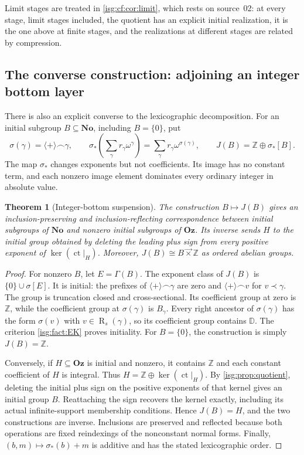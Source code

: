 \documentclass[11pt]{article}
\newtheorem{theorem}{Theorem}[section]
\theoremstyle{definition}
\theoremstyle{remark}
\newcommand{\No}{\ensuremath{\mathbf{No}}}
\newcommand{\Oz}{\ensuremath{\mathbf{Oz}}}
\newcommand{\Z}{\mathbb{Z}}
\newcommand{\D}{\mathbb{D}}
\newcommand{\Rs}{\operatorname{R}_{s}}
\newcommand{\cat}{\mathbin{\frown}}
\newcommand{\plus}{\langle+\rangle}
\newcommand{\pr}{\mathrel{\prec}}
\newcommand{\ct}{\operatorname{ct}}
\newcommand{\lex}{\mathbin{\overrightarrow{\times}}}
\begin{document}
Limit stages are treated in \cref{isg:cf:cor:limit}, which rests on
source~02: at every stage, limit stages included, the quotient has an
explicit initial realization, it is the one above at finite stages, and
the realizations at different stages are related by compression.

\subsection{The converse construction: adjoining an integer bottom layer}
There is also an explicit converse to the lexicographic decomposition.
For an initial subgroup $B\subseteq\No$, including $B=\{0\}$, put
\[
 \sigma(\gamma)=\plus\cat\gamma,
 \qquad
 \sigma_*\left(\sum_\gamma r_\gamma\omega^\gamma\right)
      =\sum_\gamma r_\gamma\omega^{\sigma(\gamma)},
 \qquad J(B)=\Z\oplus\sigma_*[B].
\]
The map $\sigma_*$ changes exponents but not coefficients. Its image has
no constant term, and each nonzero image element dominates every ordinary
integer in absolute value.

\begin{theorem}[Integer-bottom suspension]\label{isg:thm:suspension}
The construction $B\mapsto J(B)$ gives an inclusion-preserving and
inclusion-reflecting correspondence between initial subgroups of $\No$
and nonzero initial subgroups of $\Oz$. Its inverse sends $H$ to the
initial group obtained by deleting the leading plus sign from every
positive exponent of $\ker(\ct|_H)$.
Moreover, $J(B)\cong B\lex\Z$ as ordered abelian groups.
\end{theorem}
\begin{proof}
For nonzero $B$, let $E=\Gamma(B)$. The exponent class of $J(B)$ is
$\{0\}\cup\sigma[E]$. It is initial: the prefixes of
$\plus\cat\gamma$ are zero and $\plus\cat v$ for $v\pr\gamma$.
The group is truncation closed and cross-sectional. Its coefficient
group at zero is $\Z$, while the coefficient group at
$\sigma(\gamma)$ is $B_\gamma$. Every right ancestor of
$\sigma(\gamma)$ has the form $\sigma(v)$ with $v\in\Rs(\gamma)$,
so its coefficient group contains $\D$. The criterion
\cref{isg:fact:EK} proves initiality. For $B=\{0\}$, the construction
is simply $J(B)=\Z$.

Conversely, if $H\subseteq\Oz$ is initial and nonzero, it contains
$\Z$ and each constant coefficient of $H$ is integral. Thus
$H=\Z\oplus\ker(\ct|_H)$. By \cref{isg:prop:quotient}, deleting the
initial plus sign on the positive exponents of that kernel gives an
initial group $B$. Reattaching the sign recovers the kernel exactly,
including its actual infinite-support membership conditions. Hence
$J(B)=H$, and the two constructions are inverse. Inclusions are
preserved and reflected because both operations are fixed reindexings
of the nonconstant normal forms. Finally,
$(b,m)\mapsto\sigma_*(b)+m$ is additive and has the stated
lexicographic order.
\end{proof}
\end{document}
